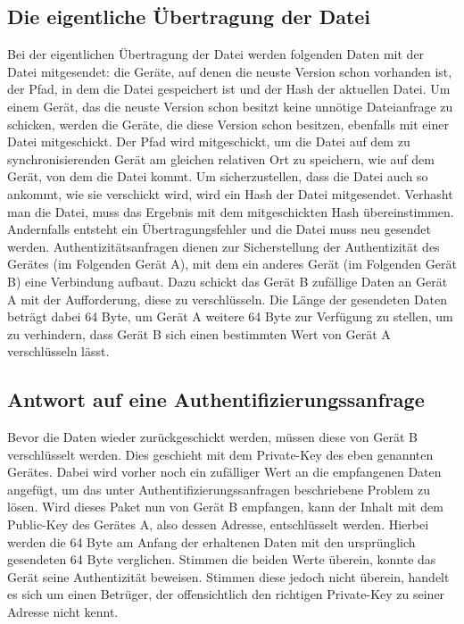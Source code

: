 \subsection{Die eigentliche Übertragung der Datei}
Bei der eigentlichen Übertragung der Datei werden folgenden Daten mit der Datei mitgesendet: die Geräte, auf denen die neuste Version schon vorhanden ist, der Pfad, in dem die Datei gespeichert ist und der Hash der aktuellen Datei. Um einem Gerät, das die neuste Version schon besitzt keine unnötige Dateianfrage zu schicken, werden die Geräte, die diese Version schon besitzen, ebenfalls mit einer Datei mitgeschickt. Der Pfad wird mitgeschickt, um die Datei auf dem zu synchronisierenden Gerät am gleichen relativen Ort zu speichern, wie auf dem Gerät, von dem die Datei kommt. Um sicherzustellen, dass die Datei auch so ankommt, wie sie verschickt wird, wird ein Hash der Datei mitgesendet. Verhasht man die Datei, muss das Ergebnis mit dem mitgeschickten Hash übereinstimmen. Andernfalls entsteht ein Übertragungsfehler und die Datei muss neu gesendet werden.
Authentizitätsanfragen dienen zur Sicherstellung der Authentizität des Gerätes (im Folgenden Gerät A), mit dem ein anderes Gerät (im Folgenden Gerät B) eine Verbindung aufbaut. Dazu schickt das Gerät B zufällige Daten an Gerät A mit der Aufforderung, diese zu verschlüsseln. Die Länge der gesendeten Daten beträgt dabei 64 Byte, um Gerät A weitere 64 Byte zur Verfügung zu stellen, um zu verhindern, dass Gerät B sich einen bestimmten Wert von Gerät A verschlüsseln lässt.

\subsection{Antwort auf eine Authentifizierungssanfrage}
Bevor die Daten wieder zurückgeschickt werden, müssen diese von Gerät B verschlüsselt werden. Dies geschieht mit dem Private-Key des eben genannten Gerätes. Dabei wird vorher noch ein zufälliger Wert an die empfangenen Daten angefügt, um das unter Authentifizierungssanfragen beschriebene Problem zu lösen.
Wird dieses Paket nun von Gerät B empfangen, kann der Inhalt mit dem Public-Key des Gerätes A, also dessen Adresse, entschlüsselt werden. Hierbei werden die 64 Byte am Anfang der erhaltenen Daten mit den ursprünglich gesendeten 64 Byte verglichen. Stimmen die beiden Werte überein, konnte das Gerät seine Authentizität beweisen. Stimmen diese jedoch nicht überein, handelt es sich um einen Betrüger, der offensichtlich den richtigen Private-Key zu seiner Adresse nicht kennt.

